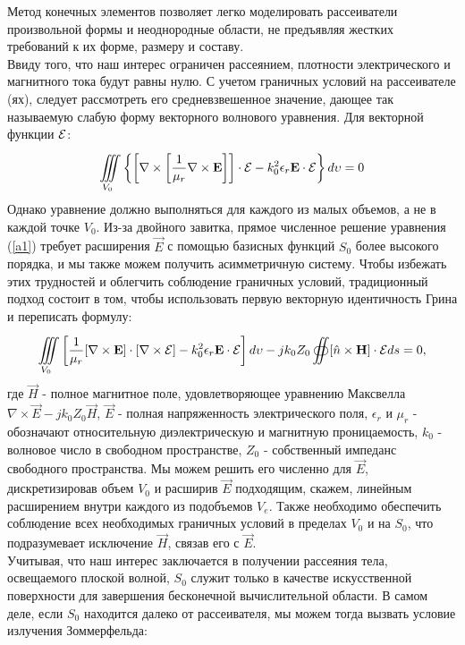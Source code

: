 Метод конечных элементов позволяет легко моделировать рассеиватели произвольной формы и неоднородные области, не предъявляя жестких требований к их форме, размеру и составу.  \\
Ввиду того, что наш интерес ограничен рассеянием, плотности электрического и магнитного тока будут равны нулю.
С учетом граничных условий на рассеивателе (ях), следует рассмотреть его средневзвешенное значение, дающее так называемую слабую форму векторного волнового уравнения. Для векторной функции $ \vec{\cal{E}} $:\\
\begin{equation}\label{a1}
	\iiint\limits_{V_{0}}^{} \left\{\left[ \nabla \times \left[ \dfrac{1}{\mu_{r}}\nabla \times \vec{E}\right]\right]\cdot \vec{\cal{E}} - k_{0}^{2} \epsilon_{r}\vec{E} \cdot \vec{\cal{E}} \right\}d\upsilon = 0
\end{equation}
Однако уравнение должно выполняться для каждого из малых объемов, а не в каждой точке $ V_{0} $. Из-за двойного завитка, прямое численное решение уравнения (\ref{a1}) требует расширения $ \vec{E} $ с помощью базисных функций $ S_{0} $ более высокого порядка, и мы также можем получить асимметричную систему. Чтобы избежать этих трудностей и облегчить соблюдение граничных условий, традиционный подход состоит в том, чтобы использовать первую векторную идентичность Грина и переписать формулу: \\
\begin{equation}
\iiint\limits_{V_{0}}^{} \left[ \dfrac{1}{\mu_{r}}[\nabla \times \vec{E}] \cdot [\nabla \times \vec{\cal{E}}] - k_{0}^{2} \epsilon_{r}\vec{E} \cdot \vec{\cal{E}} \right]d\upsilon - jk_{0}Z_{0} \oiint [\hat{n} \times \vec{H}] \cdot \vec{\cal{E}}ds = 0,
\end{equation}
где $ \vec{H} $ - полное магнитное поле, удовлетворяющее уравнению Максвелла $ \nabla \times \vec{E} - jk_{0}Z_{0}\vec{H}  $, $ \vec{E} $ - полная напряженность электрического поля, $ \epsilon_{r} $ и $ \mu_{r} $ - обозначают относительную диэлектрическую и магнитную проницаемость, $ k_{0} $ - волновое число в свободном пространстве, $ Z_{0} $ - собственный импеданс свободного пространства. Мы можем решить его численно для $ \vec{E} $, дискретизировав объем $ V_{0} $ и расширив $ \vec{E} $ подходящим, скажем, линейным расширением внутри каждого из подобъемов $V_{e}$. Также необходимо обеспечить соблюдение всех необходимых граничных условий в пределах $V_{0}$ и на $S_{0}$, что подразумевает исключение $\vec{H}$, связав его с $\vec{E}$. \\
Учитывая, что наш интерес заключается в получении рассеяния тела, освещаемого плоской волной, $S_{0}$ служит только в качестве искусственной поверхности для завершения бесконечной вычислительной области. В самом деле, если $S_{0}$ находится далеко от рассеивателя, мы можем тогда вызвать условие излучения Зоммерфельда:

